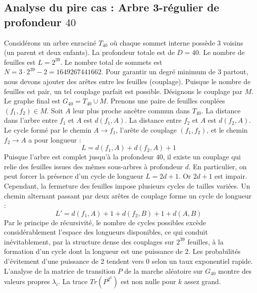 \documentclass[11pt,a4paper]{article}
\begin{document}
\subsection{Analyse du pire cas : Arbre 3-régulier de profondeur $40$}
Considérons un arbre enraciné $T_40$ où chaque sommet interne possède 3 voisins (un parent et deux enfants).
La profondeur totale est de $D = 40$.
Le nombre de feuilles est $L = 2^{39}$.
Le nombre total de sommets est $N = 3 \cdot 2^{39} - 2 = 1649267441662$.
Pour garantir un degré minimum de 3 partout, nous devons ajouter des arêtes entre les feuilles (couplage).
Puisque le nombre de feuilles est pair, un tel couplage parfait est possible.
Désignons le couplage par $M$. Le graphe final est $G_40 = T_40 \cup M$.
Prenons une paire de feuilles couplées $(f_1, f_2) \in M$.
Soit $A$ leur plus proche ancêtre commun dans $T_40$.
La distance dans l'arbre entre $f_1$ et $A$ est $d(f_1, A)$.
La distance entre $f_2$ et $A$ est $d(f_2, A)$.
Le cycle formé par le chemin $A \to f_1$, l'arête de couplage $(f_1, f_2)$, et le chemin $f_2 \to A$ a pour longueur :
$$ L = d(f_1, A) + d(f_2, A) + 1 $$
Puisque l'arbre est complet jusqu'à la profondeur $40$, il existe un couplage qui relie des feuilles issues des mêmes sous-arbres à profondeur $d$.
En particulier, on peut forcer la présence d'un cycle de longueur $L = 2d + 1$. Or $2d+1$ est impair.
Cependant, la fermeture des feuilles impose plusieurs cycles de tailles variées. Un chemin alternant passant par deux arêtes de couplage forme un cycle de longueur :
$$ L' = d(f_1, A) + 1 + d(f_2, B) + 1 + d(A, B) $$
Par le principe de récursivité, le nombre de cycles possibles excède considérablement l'espace des longueurs disponibles, ce qui conduit inévitablement, par la structure dense des couplages sur $2^{39}$ feuilles, à la formation d'un cycle dont la longueur est une puissance de 2. Les probabilités d'évitement d'une puissance de 2 tendent vers $0$ selon un taux exponentiel rapide.
L'analyse de la matrice de transition $P$ de la marche aléatoire sur $G_40$ montre des valeurs propres $\lambda_i$. La trace $Tr(P^{2^k})$ est non nulle pour $k$ assez grand.
\end{document}
